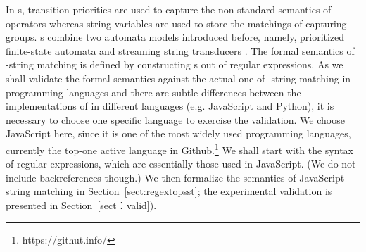 In {\PSST}s, transition priorities are used to capture the non-standard semantics of {\regexp} operators whereas string variables are used to store the matchings of capturing groups. {\PSST}s combine two automata models introduced before, namely, prioritized finite-state automata \cite{BM17} and streaming string transducers \cite{AC10,AD11}. The formal semantics of {\regexp}-string matching is defined by constructing {\PSST}s out of regular expressions. 
%
As we shall validate the formal semantics against the actual one of {\regexp}-string matching in programming languages and there are subtle differences between the implementations of {\regexp} in different languages (e.g. JavaScript and Python), it is necessary to choose one specific language to exercise the validation. We choose JavaScript here, since it is one of the most widely used programming languages,  currently the top-one active language in Github.\footnote{https://githut.info/}
We shall start with the syntax of regular expressions, which are essentially those used in JavaScript. (We do not include backreferences though.) We then formalize the semantics of JavaScript \regexp-string matching in Section~\ref{sect:regextopsst}; the experimental validation is presented in 
Section~\ref{sect：valid}).
%

